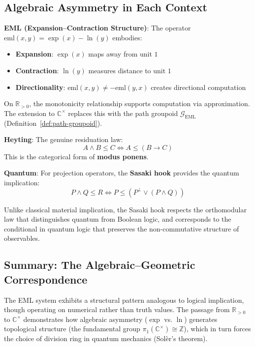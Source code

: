 \documentclass[11pt]{article}
\providecommand{\tightlist}{%
  \setlength{\itemsep}{0pt}\setlength{\parskip}{0pt}}
\begin{document}
\subsection{Algebraic Asymmetry in Each Context}
\label{algebraic-asymmetry-in-each-context}

\textbf{EML (Expansion--Contraction Structure)}: The operator \(\mathrm{eml}(x, y) = \exp(x) - \ln(y)\) embodies:
\begin{itemize}
\tightlist
\item
  \textbf{Expansion}: \(\exp(x)\) maps away from unit \(1\)
\item
  \textbf{Contraction}: \(\ln(y)\) measures distance to unit \(1\)
\item
  \textbf{Directionality}: \(\mathrm{eml}(x,y) \neq -\mathrm{eml}(y,x)\) creates directional computation
\end{itemize}

On \(\mathbb{R}_{>0}\), the monotonicity relationship supports computation via approximation. The extension to \(\mathbb{C}^\times\) replaces this with the path groupoid \(\mathcal{G}_{\text{EML}}\) (Definition~\ref{def:path-groupoid}).

\textbf{Heyting}: The genuine residuation law: \[A \wedge B \leq C \iff A \leq (B \to C)\] This is the categorical form of \textbf{modus ponens}.

\textbf{Quantum}: For projection operators, the \textbf{Sasaki hook} provides the quantum implication: \[P \wedge Q \leq R \iff P \leq (P^\perp \vee (P \wedge Q))\]

Unlike classical material implication, the Sasaki hook respects the orthomodular law that distinguishes quantum from Boolean logic, and corresponds to the conditional in quantum logic that preserves the non-commutative structure of observables.

\subsection{Summary: The Algebraic--Geometric Correspondence}
\label{summary-algebraic-geometric}

The EML system exhibits a structural pattern analogous to logical implication, though operating on numerical rather than truth values. The passage from \(\mathbb{R}_{>0}\) to \(\mathbb{C}^\times\) demonstrates how algebraic asymmetry (\(\exp\) vs. \(\ln\)) generates topological structure (the fundamental group \(\pi_1(\mathbb{C}^\times) \cong \mathbb{Z}\)), which in turn forces the choice of division ring in quantum mechanics (Sol\`{e}r's theorem).
\end{document}
